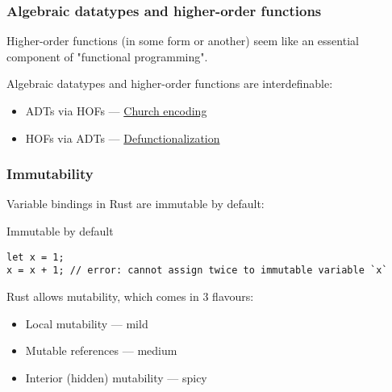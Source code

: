 \documentclass[t]{beamer}
\begin{document}
\begin{frame}[fragile]
\frametitle{Algebraic datatypes and higher-order functions}
\begin{comment}
It seems reasonable to me to claim that higher-order functions are an essential part
of functional programming.

I've put algebraic datatypes and higher-order functions in the same section
because they're actually interdefinable. If you have one, then you have the other
(assuming you have first-order function definitions).

Using higher-order functions to define algebraic datatypes is called Church encoding.

Going the other way, algebraic datatypes (together with first-order functions) to
can be used to define higher-order functions through a method
called Defunctionalisation, which was the subject of Jack's recent talk, "Everything
looks like a function".
\end{comment}

Higher-order functions (in some form or another) seem like an essential component of "functional programming".

\bigskip

Algebraic datatypes and higher-order functions are interdefinable:

\begin{itemize}
\item ADTs via HOFs --- \href{https://en.wikipedia.org/wiki/Church_encoding}{Church encoding}
\item HOFs via ADTs --- \href{https://en.wikipedia.org/wiki/Defunctionalization}{Defunctionalization}
\end{itemize}

\end{frame}


\begin{frame}[fragile]
\frametitle{Immutability}

Variable bindings in Rust are immutable by default:

\begin{block}{Immutable by default}
\small
\begin{verbatim}
let x = 1;
x = x + 1; // error: cannot assign twice to immutable variable `x`
\end{verbatim}
\end{block}

\bigskip

Rust allows mutability, which comes in 3 flavours:

\begin{itemize}
\item Local mutability --- mild
\item Mutable references --- medium
\item Interior (hidden) mutability --- spicy
\end{itemize}
\end{frame}
\end{document}
